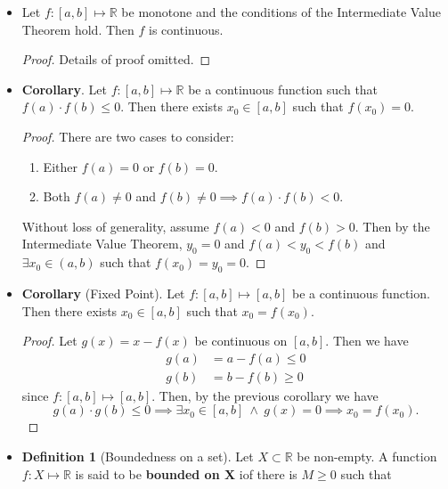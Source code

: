 \documentclass{article}
\newcommand{\R}{\mathbb{R}}
\newcommand{\?}{\stackrel{?}{=}}
\theoremstyle{definition} %
\newtheorem{definition}[subsection]{Definition} %
\begin{document}
\begin{itemize}
\begin{definition}[Monotone functions]
          \end{definition}
    \item[]
          \begin{lemma}
              Let $f: [a, b] \mapsto \R$ be monotone and the conditions of the Intermediate Value Theorem hold. Then $f$ is continuous.
          \end{lemma}
          \begin{proof}
              Details of proof omitted.
          \end{proof}
    \item \textbf{Corollary}. Let $f: [a, b] \mapsto \R$ be a continuous function such that $f(a) \cdot f(b) \leq 0$. Then there exists $x_0 \in [a, b]$ such that $f(x_0) = 0$.
          \begin{proof}
              There are two cases to consider:
              \begin{enumerate}[label=(\arabic*)]
                  \item Either $f(a) = 0$ or $f(b) = 0$.
                  \item Both $f(a) \neq 0$ and $f(b) \neq 0 \implies f(a) \cdot f(b) < 0$.
              \end{enumerate}
              Without loss of generality, assume $f(a) < 0$ and $f(b) > 0$. Then by the Intermediate Value Theorem, $y_0 = 0$ and $f(a) < y_0 < f(b)$ and $\exists x_0 \in (a, b)$ such that $f(x_0) = y_0 = 0$.
          \end{proof}
    \item \textbf{Corollary} (Fixed Point). Let $f: [a, b] \mapsto [a, b]$ be a continuous function. Then there exists $x_0 \in [a, b]$ such that $x_0 = f(x_0)$.
          \begin{proof}
              Let $g(x) = x - f(x)$ be continuous on $[a, b]$. Then we have
              \begin{align*}
                  g(a) & = a - f(a) \leq 0 \\
                  g(b) & = b - f(b) \geq 0
              \end{align*}
              since $f: [a, b] \mapsto [a, b]$. Then, by the previous corollary we have
              $$g(a) \cdot g(b) \leq 0 \implies \exists x_0 \in [a, b] \ \land \ g(x) = 0 \implies x_0 = f(x_0).$$
          \end{proof}
    \item[]
          \begin{definition}[Boundedness on a set]
              Let $X \subset \R$ be non-empty. A function $f: X \mapsto \R$ is said to be \textbf{bounded on X} iof there is $M \geq 0$ such that

\end{definition}
\end{itemize}
\end{document}
